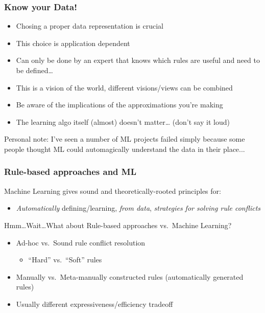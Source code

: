 \documentclass[usenames,dvipsnames]{beamer}
\newcommand{\voc}[1]{\emph{\color{ForestGreen}#1}}
\begin{document}
\begin{frame}\frametitle{Know your Data!}

\begin{itemize}
\item Chosing a proper data representation is crucial
\item This choice is application dependent
\item Can only be done by an expert that knows which rules are
useful and need to be defined\ldots
\item This is a vision of the world, different visions/views can be
  combined
\item Be aware of the implications of the approximations you're making
\item \pause The learning algo itself (almost) doesn't matter\ldots
  (don't say it loud)
\end{itemize}

\vspace{0.4cm}
\pause
Personal note: I've seen a number of ML projects failed simply because
some people thought ML could automagically understand the data in their place...

\end{frame}


\begin{frame}\frametitle{Rule-based approaches and ML}

\begin{block}{Machine Learning gives sound and theoretically-rooted principles for:}
\begin{itemize}
\item \emph{Automatically} defining/learning, \voc{from data}, \voc{strategies for solving rule conflicts}
\end{itemize}
\end{block}

Hmm\ldots Wait\ldots What about Rule-based approaches vs.\ Machine
Learning?

\vspace{0.4cm}
\pause
\begin{itemize}
\item Ad-hoc vs.\ Sound rule conflict resolution
\begin{itemize}
\item ``Hard'' vs.\ ``Soft'' rules
\end{itemize}
\item Manually vs.\ Meta-manually constructed rules (automatically
  generated rules)
\item Usually different expressiveness/efficiency tradeoff
\end{itemize}

\end{frame}
\end{document}
